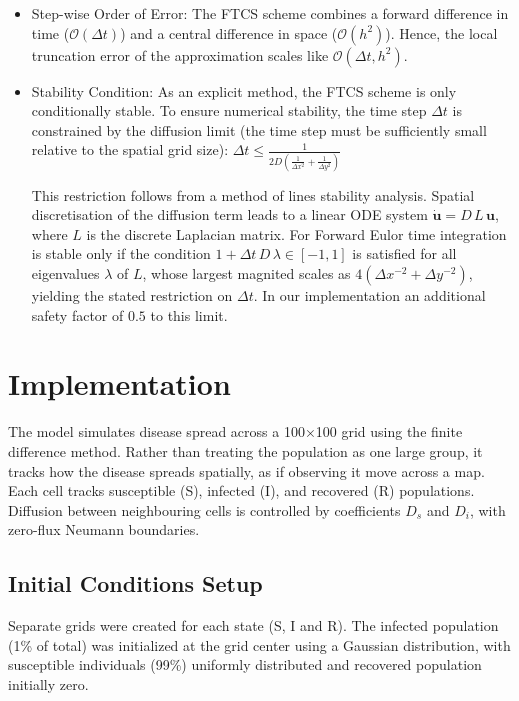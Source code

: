 \documentclass[
]{article}
\begin{document}
\begin{itemize}
\item
  Step-wise Order of Error: The FTCS scheme combines a forward
  difference in time (\(\mathcal{O}(\Delta t)\)) and a central
  difference in space (\(\mathcal{O}(h^2)\)). Hence, the local
  truncation error of the approximation scales like
  \(\mathcal{O}(\Delta t,h^2)\).
\item
  Stability Condition: As an explicit method, the FTCS scheme is only
  conditionally stable. To ensure numerical stability, the time step
  \(\Delta t\) is constrained by the diffusion limit (the time step must
  be sufficiently small relative to the spatial grid size):
  \(\Delta t \le \frac{1}{2D\left(\frac{1}{\Delta x^2} + \frac{1}{\Delta y^2}\right)}\)

  This restriction follows from a method of lines stability analysis.
  Spatial discretisation of the diffusion term leads to a linear ODE
  system \(\dot{\mathbf{u}} = D\,L\,\mathbf{u}\), where \(L\) is the
  discrete Laplacian matrix. For Forward Eulor time integration is
  stable only if the condition \(1 + \Delta t\,D\,\lambda \in [-1,1]\)
  is satisfied for all eigenvalues \(\lambda\) of \(L\), whose largest
  magnited scales as \(4(\Delta x^{-2} + \Delta y^{-2})\), yielding the
  stated restriction on \(\Delta t\). In our implementation an
  additional safety factor of \(0.5\) to this limit.
\end{itemize}

\section{Implementation}\label{implementation}

The model simulates disease spread across a 100×100 grid using the
finite difference method. Rather than treating the population as one
large group, it tracks how the disease spreads spatially, as if
observing it move across a map. Each cell tracks susceptible (S),
infected (I), and recovered (R) populations. Diffusion between
neighbouring cells is controlled by coefficients \(D_s\) and \(D_i\),
with zero-flux Neumann boundaries.

\subsection{Initial Conditions Setup}\label{initial-conditions-setup}

Separate grids were created for each state (S, I and R). The infected
population (1\% of total) was initialized at the grid center using a
Gaussian distribution, with susceptible individuals (99\%) uniformly
distributed and recovered population initially zero.
\end{document}
